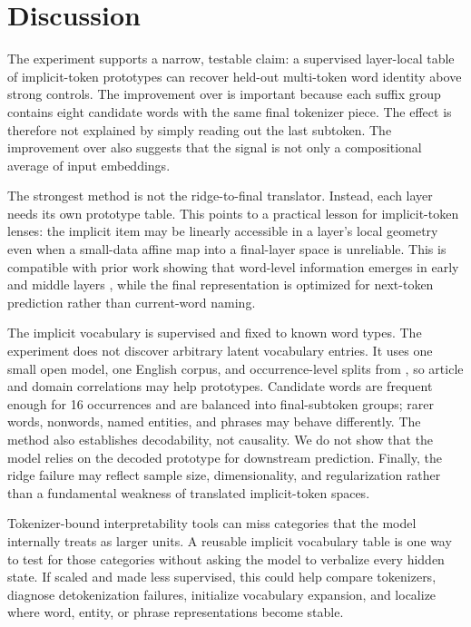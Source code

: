 \section{Discussion}
\label{sec:discussion}

The experiment supports a narrow, testable claim: a supervised layer-local table of implicit-token prototypes can recover held-out multi-token word identity above strong controls. The improvement over \finalmajority is important because each suffix group contains eight candidate words with the same final tokenizer piece. The effect is therefore not explained by simply reading out the last subtoken. The improvement over \meansubtok also suggests that the signal is not only a compositional average of input embeddings.

The strongest method is not the ridge-to-final translator. Instead, each layer needs its own prototype table. This points to a practical lesson for implicit-token lenses: the implicit item may be linearly accessible in a layer's local geometry even when a small-data affine map into a final-layer space is unreliable. This is compatible with prior work showing that word-level information emerges in early and middle layers \citep{kaplan2025tokens}, while the final representation is optimized for next-token prediction rather than current-word naming.

The implicit vocabulary is supervised and fixed to known word types. The experiment does not discover arbitrary latent vocabulary entries. It uses one small open model, one English corpus, and occurrence-level splits from \wikitext, so article and domain correlations may help prototypes. Candidate words are frequent enough for 16 occurrences and are balanced into final-subtoken groups; rarer words, nonwords, named entities, and phrases may behave differently. The method also establishes decodability, not causality. We do not show that the model relies on the decoded prototype for downstream prediction. Finally, the ridge failure may reflect sample size, dimensionality, and regularization rather than a fundamental weakness of translated implicit-token spaces.

Tokenizer-bound interpretability tools can miss categories that the model internally treats as larger units. A reusable implicit vocabulary table is one way to test for those categories without asking the model to verbalize every hidden state. If scaled and made less supervised, this could help compare tokenizers, diagnose detokenization failures, initialize vocabulary expansion, and localize where word, entity, or phrase representations become stable.
